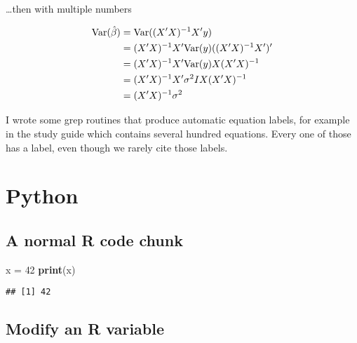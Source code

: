 \documentclass[]{book}
\newenvironment{Shaded}{\begin{snugshade}}{\end{snugshade}}
\newcommand{\DataTypeTok}[1]{\textcolor[rgb]{0.13,0.29,0.53}{#1}}
\newcommand{\DecValTok}[1]{\textcolor[rgb]{0.00,0.00,0.81}{#1}}
\newcommand{\KeywordTok}[1]{\textcolor[rgb]{0.13,0.29,0.53}{\textbf{#1}}}
\newcommand{\NormalTok}[1]{#1}
\newcommand{\OperatorTok}[1]{\textcolor[rgb]{0.81,0.36,0.00}{\textbf{#1}}}
\newcommand{\OtherTok}[1]{\textcolor[rgb]{0.56,0.35,0.01}{#1}}
\newcommand{\StringTok}[1]{\textcolor[rgb]{0.31,0.60,0.02}{#1}}
\begin{document}
\ldots{}then with multiple numbers

\begin{align}
\mathrm{Var}(\hat{\beta}) & =\mathrm{Var}((X'X)^{-1}X'y) \notag \\
 & =(X'X)^{-1}X'\mathrm{Var}(y)((X'X)^{-1}X')'\label{eq:var-a}\\ 
 & =(X'X)^{-1}X'\mathrm{Var}(y)X(X'X)^{-1}\label{eq:var-b}\\ 
 & =(X'X)^{-1}X'\sigma^{2}IX(X'X)^{-1}\label{eq:var-c}\\ 
 & =(X'X)^{-1}\sigma^{2} \label{eq:var-d}
\end{align}

I wrote some grep routines that produce automatic equation labels, for example in the study guide which contains several hundred equations. Every one of those has a label, even though we rarely cite those labels.

\hypertarget{python}{%
\chapter{Python}\label{python}}

\hypertarget{a-normal-r-code-chunk}{%
\section{A normal R code chunk}\label{a-normal-r-code-chunk}}

\begin{Shaded}
\end{Shaded}

\begin{Shaded}
\begin{Highlighting}[]
\NormalTok{x =}\StringTok{ }\DecValTok{42}
\KeywordTok{print}\NormalTok{(x)}
\end{Highlighting}
\end{Shaded}

\begin{verbatim}
## [1] 42
\end{verbatim}

\hypertarget{modify-an-r-variable}{%
\section{Modify an R variable}\label{modify-an-r-variable}}
\end{document}
